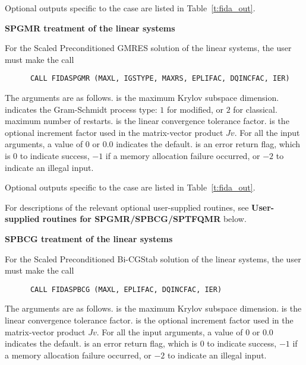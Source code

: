 \begin{Steps}
  Optional outputs specific to the {\band} case are listed in
  Table~\ref{t:fida_out}.


  {\s}{\p} {\bf SPGMR treatment of the linear systems}
  
  For the Scaled Preconditioned GMRES solution of the linear systems,
  the user must make the call
\begin{verbatim}
      CALL FIDASPGMR (MAXL, IGSTYPE, MAXRS, EPLIFAC, DQINCFAC, IER)
\end{verbatim}
  The arguments are as follows.
   is the maximum Krylov subspace dimension.
   indicates the Gram-Schmidt process type: $1$ for modified,
   or $2$ for classical.
   maximum number of restarts.
   is the linear convergence tolerance factor.
   is the optional increment factor used in the matrix-vector product
  $Jv$.
  For all the input arguments, a value of 0 or $0.0$ indicates the default.
   is an error return flag, which is $0$ to indicate success, $-1$
  if a memory allocation failure occurred, or $-2$ to indicate an illegal input.
  
  Optional outputs specific to the {\spgmr} case are listed in
  Table~\ref{t:fida_out}.

  For descriptions of the relevant optional user-supplied routines, see 
  {\bf User-supplied routines for SPGMR/SPBCG/SPTFQMR} below.


  {\s}{\p} {\bf SPBCG treatment of the linear systems}
  
  For the Scaled Preconditioned Bi-CGStab solution of the linear systems,
  the user must make the call
\begin{verbatim}
      CALL FIDASPBCG (MAXL, EPLIFAC, DQINCFAC, IER)
\end{verbatim}
  The arguments are as follows.
   is the maximum Krylov subspace dimension.
   is the linear convergence tolerance factor.
   is the optional increment factor used in the matrix-vector product
  $Jv$.
  For all the input arguments, a value of 0 or $0.0$ indicates the default.
   is an error return flag, which is $0$ to indicate success, $-1$
  if a memory allocation failure occurred, or $-2$ to indicate an illegal input.
  

\end{Steps}
